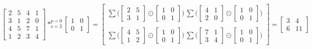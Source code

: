 \begin{equation}
    \begin{bmatrix}
        2 & 5 & 4 & 1 \\
        3 & 1 & 2 & 0 \\
        4 & 5 & 7 & 1 \\
        1 & 2 & 3 & 4
    \end{bmatrix} *^{p=0}_{s=2} \begin{bmatrix}
        1 & 0 \\
        0 & 1
    \end{bmatrix}
    = \begin{bmatrix}
        \sum{\Bigg( \begin{bmatrix}
            2 & 5 \\
            3 & 1
        \end{bmatrix} \odot \begin{bmatrix}
            1 & 0 \\
            0 & 1
        \end{bmatrix} \Bigg)} \,
        \sum{\Bigg( \begin{bmatrix}
            4 & 1 \\
            2 & 0
        \end{bmatrix} \odot \begin{bmatrix}
            1 & 0 \\
            0 & 1
        \end{bmatrix} \Bigg)} \\ \\
        \sum{\Bigg( \begin{bmatrix}
            4 & 5 \\
            1 & 2
        \end{bmatrix} \odot \begin{bmatrix}
            1 & 0 \\
            0 & 1
        \end{bmatrix} \Bigg)} \,
        \sum{\Bigg( \begin{bmatrix}
            7 & 1 \\
            3 & 4
        \end{bmatrix} \odot \begin{bmatrix}
            1 & 0 \\
            0 & 1
        \end{bmatrix} \Bigg)}
    \end{bmatrix}
    = \begin{bmatrix}
        3 & 4 \\
        6 & 11
    \end{bmatrix}
\end{equation}

